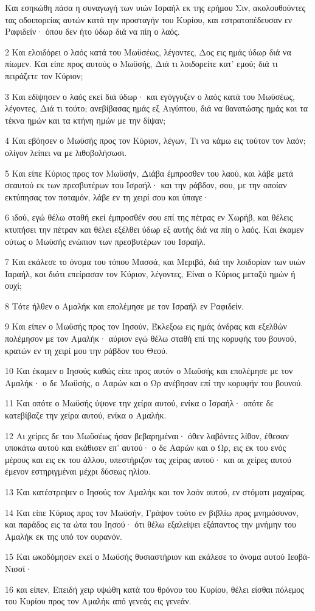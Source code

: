 \par Και εσηκώθη πάσα η συναγωγή των υιών Ισραήλ εκ της ερήμου Σιν, ακολουθούντες τας οδοιπορείας αυτών κατά την προσταγήν του Κυρίου, και εστρατοπέδευσαν εν Ραφιδείν· όπου δεν ήτο ύδωρ διά να πίη ο λαός.
\par 2 Και ελοιδόρει ο λαός κατά του Μωϋσέως, λέγοντες, Δος εις ημάς ύδωρ διά να πίωμεν. Και είπε προς αυτούς ο Μωϋσής, Διά τι λοιδορείτε κατ' εμού; διά τι πειράζετε τον Κύριον;
\par 3 Και εδίψησεν ο λαός εκεί διά ύδωρ· και εγόγγυζεν ο λαός κατά του Μωϋσέως, λέγοντες, Διά τι τούτο; ανεβίβασας ημάς εξ Αιγύπτου, διά να θανατώσης ημάς και τα τέκνα ημών και τα κτήνη ημών με την δίψαν;
\par 4 Και εβόησεν ο Μωϋσής προς τον Κύριον, λέγων, Τι να κάμω εις τούτον τον λαόν; ολίγον λείπει να με λιθοβολήσωσι.
\par 5 Και είπε Κύριος προς τον Μωϋσήν, Διάβα έμπροσθεν του λαού, και λάβε μετά σεαυτού εκ των πρεσβυτέρων του Ισραήλ· και την ράβδον, σου, με την οποίαν εκτύπησας τον ποταμόν, λάβε εν τη χειρί σου και ύπαγε·
\par 6 ιδού, εγώ θέλω σταθή εκεί έμπροσθέν σου επί της πέτρας εν Χωρήβ, και θέλεις κτυπήσει την πέτραν και θέλει εξέλθει ύδωρ εξ αυτής διά να πίη ο λαός. Και έκαμεν ούτως ο Μωϋσής ενώπιον των πρεσβυτέρων του Ισραήλ.
\par 7 Και εκάλεσε το όνομα του τόπου Μασσά, και Μεριβά, διά την λοιδορίαν των υιών Ιαραήλ, και διότι επείρασαν τον Κύριον, λέγοντες, Είναι ο Κύριος μεταξύ ημών ή ουχί;
\par 8 Τότε ήλθεν ο Αμαλήκ και επολέμησε με τον Ισραήλ εν Ραφιδείν.
\par 9 Και είπεν ο Μωϋσής προς τον Ιησούν, Έκλεξοω εις ημάς άνδρας και εξελθών πολέμησον με τον Αμαλήκ· αύριον εγώ θέλω σταθή επί της κορυφής του βουνού, κρατών εν τη χειρί μου την ράβδον του Θεού.
\par 10 Και έκαμεν ο Ιησούς καθώς είπε προς αυτόν ο Μωϋσής και επολέμησε με τον Αμαλήκ· ο δε Μωϋσής, ο Ααρών και ο Ωρ ανέβησαν επί την κορυφήν του βουνού.
\par 11 Και οπότε ο Μωϋσής ύψονε την χείρα αυτού, ενίκα ο Ισραήλ· οπότε δε κατεβίβαζε την χείρα αυτού, ενίκα ο Αμαλήκ.
\par 12 Αι χείρες δε του Μωϋσέως ήσαν βεβαρημέναι· όθεν λαβόντες λίθον, έθεσαν υποκάτω αυτού και εκάθισεν επ' αυτού· ο δε Ααρών και ο Ωρ, εις εκ του ενός μέρους και εις εκ του άλλου, υπεστήριζον τας χείρας αυτού· και αι χείρες αυτού έμενον εστηριγμέναι μέχρι δύσεως ηλίου.
\par 13 Και κατέστρεψεν ο Ιησούς τον Αμαλήκ και τον λαόν αυτού, εν στόματι μαχαίρας.
\par 14 Και είπε Κύριος προς τον Μωϋσήν, Γράψον τούτο εν βιβλίω προς μνημόσυνον, και παράδος εις τα ώτα του Ιησού· ότι θέλω εξαλείψει εξάπαντος την μνήμην του Αμαλήκ εκ της υπό τον ουρανόν.
\par 15 Και ωκοδόμησεν εκεί ο Μωϋσής θυσιαστήριον και εκάλεσε το όνομα αυτού Ιεοβά-Νισσί·
\par 16 και είπεν, Επειδή χειρ υψώθη κατά του θρόνου του Κυρίου, θέλει είσθαι πόλεμος του Κυρίου προς τον Αμαλήκ από γενεάς εις γενεάν.

